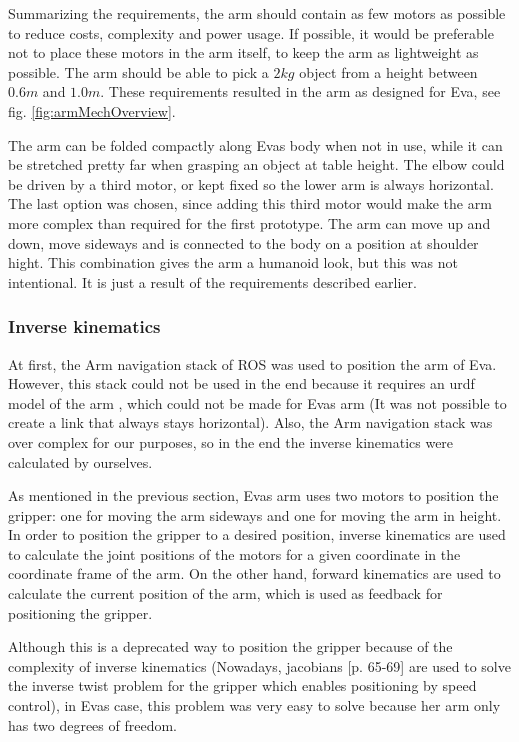 \documentclass[project_eva.tex]{subfiles}
\begin{document}
Summarizing the requirements, the arm should contain as few motors as possible to reduce costs, complexity and power 
usage. If possible, it would be preferable not to place these motors in the arm itself, to keep the arm as lightweight as 
possible. The arm should be able to pick a $2kg$ object from a height between $0.6m$ and $1.0m$. These requirements 
resulted in the arm as designed for Eva, see fig. \ref{fig:armMechOverview}.

The arm can be folded compactly along Eva\textquotesingle s body when not in use, while it can be stretched pretty far 
when grasping an object at table height. The elbow could be driven by a third motor, or kept fixed so the lower arm is 
always horizontal. The last option was chosen, since adding this third motor would make the arm more complex than 
required for the first prototype. The arm can move up and down, move sideways and is connected to the body on a position 
at shoulder hight. This combination gives the arm a humanoid look, but this was not intentional. It is just a result of 
the requirements described earlier.

\subsubsection*{Inverse kinematics}
At first, the Arm navigation stack of ROS was used to position the arm of Eva. However, this stack could not be used in 
the end because it requires an urdf model of the arm \cite{urdf}, which could not be made for Eva\textquotesingle s arm 
(It was not possible to create a link that always stays horizontal). Also, the Arm navigation stack was over complex for 
our purposes, so in the end the inverse kinematics were calculated by ourselves.  

As mentioned in the previous section, Eva\textquotesingle s arm uses two motors to position the gripper: one for moving 
the arm sideways and one for moving the arm in height. In order to position the gripper to a desired position, inverse 
kinematics are used to calculate the joint positions of the motors for a given coordinate in the coordinate frame of the 
arm. On the other hand, forward kinematics are used to calculate the current position of the arm, which is used as 
feedback for positioning the gripper. 

Although this is a deprecated way to position the gripper because of the complexity of inverse kinematics  (Nowadays, 
jacobians \cite{jacobian} [p. 65-69] are used to solve the inverse twist 
problem for the gripper which enables positioning by speed control), in Eva\textquotesingle s case, this problem was 
very easy to solve because her arm only has two degrees of freedom. 
\end{document}
